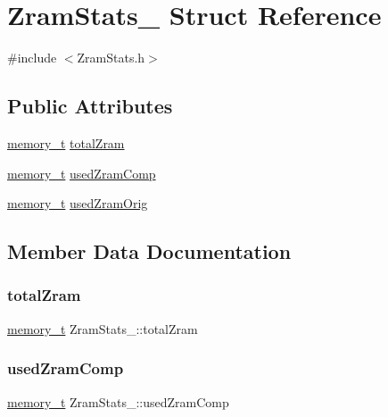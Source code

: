 \hypertarget{structZramStats__}{}\section{Zram\+Stats\+\_\+ Struct Reference}
\label{structZramStats__}


{\ttfamily \#include $<$Zram\+Stats.\+h$>$}

\subsection*{Public Attributes}
\begin{DoxyCompactItemize}
\item 
\hyperlink{Machine_8h_ac8c2c5995f64727051f4034a810e5b07}{memory\+\_\+t} \hyperlink{structZramStats___ad8be8fd74867c5258d6072dd65c36c24}{total\+Zram}
\item 
\hyperlink{Machine_8h_ac8c2c5995f64727051f4034a810e5b07}{memory\+\_\+t} \hyperlink{structZramStats___a873d5fa6b7c66f7f658fcecb37463fde}{used\+Zram\+Comp}
\item 
\hyperlink{Machine_8h_ac8c2c5995f64727051f4034a810e5b07}{memory\+\_\+t} \hyperlink{structZramStats___a1633db7f4c209c64af90320fbdd6da3e}{used\+Zram\+Orig}
\end{DoxyCompactItemize}


\subsection{Member Data Documentation}
\mbox{\label{structZramStats___ad8be8fd74867c5258d6072dd65c36c24}} 
\subsubsection{\texorpdfstring{total\+Zram}{totalZram}}
{\footnotesize\ttfamily \hyperlink{Machine_8h_ac8c2c5995f64727051f4034a810e5b07}{memory\+\_\+t} Zram\+Stats\+\_\+\+::total\+Zram}

\mbox{\label{structZramStats___a873d5fa6b7c66f7f658fcecb37463fde}} 
\subsubsection{\texorpdfstring{used\+Zram\+Comp}{usedZramComp}}
{\footnotesize\ttfamily \hyperlink{Machine_8h_ac8c2c5995f64727051f4034a810e5b07}{memory\+\_\+t} Zram\+Stats\+\_\+\+::used\+Zram\+Comp}

